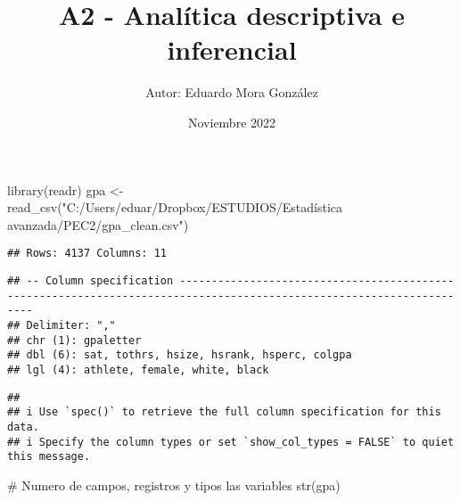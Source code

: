 \documentclass[
]{article}
\title{A2 - Analítica descriptiva e inferencial}
\author{Autor: Eduardo Mora González}
\date{Noviembre 2022}
\newenvironment{Shaded}{\begin{snugshade}}{\end{snugshade}}
\newcommand{\CommentTok}[1]{\textcolor[rgb]{0.50,0.62,0.50}{#1}}
\newcommand{\FunctionTok}[1]{\textcolor[rgb]{0.94,0.94,0.56}{#1}}
\newcommand{\NormalTok}[1]{\textcolor[rgb]{0.80,0.80,0.80}{#1}}
\newcommand{\OtherTok}[1]{\textcolor[rgb]{0.94,0.94,0.56}{#1}}
\newcommand{\StringTok}[1]{\textcolor[rgb]{0.80,0.58,0.58}{#1}}
\begin{document}
\maketitle

{
\setcounter{tocdepth}{2}
\tableofcontents
}
\begin{Shaded}
\begin{Highlighting}[]
 \FunctionTok{library}\NormalTok{(readr)}
\NormalTok{ gpa }\OtherTok{\textless{}{-}} \FunctionTok{read\_csv}\NormalTok{(}\StringTok{"C:/Users/eduar/Dropbox/ESTUDIOS/Estadística avanzada/PEC2/gpa\_clean.csv"}\NormalTok{)}
\end{Highlighting}
\end{Shaded}

\begin{verbatim}
## Rows: 4137 Columns: 11
\end{verbatim}

\begin{verbatim}
## -- Column specification ---------------------------------------------------------------------------------------------------------------------
## Delimiter: ","
## chr (1): gpaletter
## dbl (6): sat, tothrs, hsize, hsrank, hsperc, colgpa
## lgl (4): athlete, female, white, black
\end{verbatim}

\begin{verbatim}
## 
## i Use `spec()` to retrieve the full column specification for this data.
## i Specify the column types or set `show_col_types = FALSE` to quiet this message.
\end{verbatim}

\begin{Shaded}
\begin{Highlighting}[]
\CommentTok{\# Numero de campos, registros y tipos las variables}
\FunctionTok{str}\NormalTok{(gpa)}
\end{Highlighting}
\end{Shaded}
\end{document}
